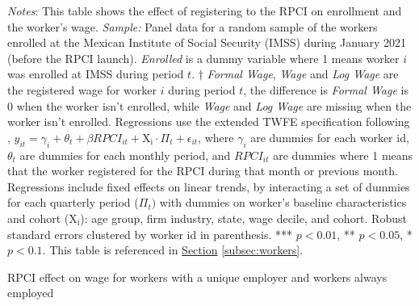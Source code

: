 \documentclass[oneside,11pt]{article}
\begin{document}
\begin{table}[H]
\begin{threeparttable}
\begin{tablenotes}
\setlength{}
\scriptsize
\item \textit{Notes}: This table shows the effect of registering to the RPCI on enrollment and the worker's wage. \textit{Sample:} Panel data for a random sample of the workers enrolled at the Mexican Institute of Social Security (IMSS) during January 2021 (before the RPCI launch). \textit{Enrolled} is a dummy variable where 1 means worker $i$ was enrolled at IMSS during period $t$. $\dagger$ \textit{Formal Wage}, \textit{Wage} and \textit{Log Wage} are the registered wage for worker $i$ during period $t$, the difference is \textit{Formal Wage} is 0 when the worker isn't enrolled, while \textit{Wage} and \textit{Log Wage} are missing when the worker isn't enrolled. Regressions use the extended TWFE specification following \cite{wooldridge2021two}, $y_{it} = \gamma_{i} + \theta_{t}+ \beta RPCI_{it} + \mathrm{X_i}\cdot\Pi_t +\epsilon_{it}$, where $\gamma_{i}$ are dummies for each worker id, $\theta_{t}$ are dummies for each monthly period, and $RPCI_{it}$ are dummies where 1 means that the worker registered for the RPCI during that month or previous month. Regressions include fixed effects on linear trends, by interacting a set of dummies for each quarterly period ($\Pi_t)$ with dummies on worker's baseline characteristics and cohort ($\mathrm{X_i}$): age group, firm industry, state, wage decile, and cohort. Robust standard errors clustered by worker id in parenthesis. *** $p<0.01$, ** $p<0.05$, * $p<0.1$. This table is referenced in \hyperref[subsec:workers]{Section} \ref{subsec:workers}.
\end{tablenotes}
\end{threeparttable}
\end{table}

\clearpage

\begin{table}[H]
    \caption{RPCI effect on wage for workers with a unique employer and workers always employed}
    \label{twfe_wage_same_idrfc}
    \begin{center}
    \scriptsize{}
    \end{center}
\end{table}
\end{document}
